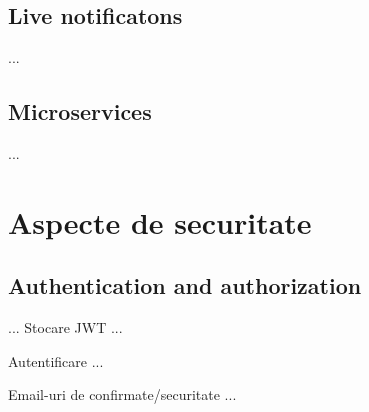     \subsection{Live notificatons}
    ...
    
    \subsection{Microservices}
    ...
    
    \section{Aspecte de securitate}
    \subsection{Authentication and authorization}
    ...
    Stocare JWT ...

    Autentificare ...

    Email-uri de confirmate/securitate ...
    
\newpage